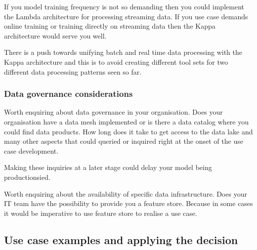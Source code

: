 If you model training frequency is not so demanding then you could implement the Lambda architecture for processing streaming data.
If you use case demands online training or training directly on streaming data then the Kappa architecture would serve you well.

There is a push towards unifying batch and real time data processing with the Kappa architecture and this is to avoid creating different tool sets for two different data processing patterns seen so far.

\subsubsection{Data governance considerations}
Worth enquiring about data governance in your organisation.
Does your organisation have a data mesh implemented or is there a data catalog where you could find data products.
How long does it take to get access to the data lake and many other aspects that could queried or inquired right at the onset of the use case development.

\begin{note}
    Making these inquiries at a later stage could delay your model being productionsied.
\end{note}

Worth enquiring about the availability of specific data infrastructure.
Does your IT team have the possibility to provide you a feature store.
Because in some cases it would be imperative to use feature store to realise a use case.

\subsection{Use case examples and applying the decision}
